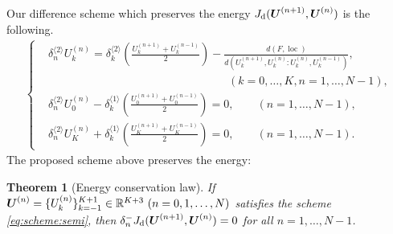 \documentclass[dvipdfmx-if-dvi,autodetect-engine,ja=standard]{amsart}
\numberwithin{equation}{section} %
\def\vect#1{\mbox{\boldmath $#1$}} %
\DeclareMathOperator{\loc}{loc}
\newtheorem{theorem}[definition]{Theorem}
\begin{document}
Our difference scheme which
preserves the energy
$J_{\mathrm{d}}(\vect{U}^{(n+1)}, \vect{U}^{(n)})$
is the following.
\begin{align}\label{eq:scheme:semi}
    \left\{
    \begin{alignedat}{1}
    &\delta_n^{\langle 2\rangle} U_k^{(n)}
    = \delta_k^{\langle 2 \rangle}
    \left(
        \frac{U_k^{(n+1)}+U_k^{(n-1)}}{2}
    \right)
    -
        \frac{d(F,\loc)}{d(U_k^{(n+1)},U_k^{(n)} : U_k^{(n)}, U_k^{(n-1)})}, \\
    &\qquad \qquad \qquad \qquad \qquad \qquad \qquad \qquad 
        (k=0,\ldots,K, n=1,\ldots,N-1),\\
    &\delta_n^{\langle 2\rangle} U_0^{(n)}
        - \delta_k^{\langle 1 \rangle}
        \left(
            \frac{U_0^{(n+1)}+U_0^{(n-1)}}{2}
        \right)
        = 0,
        \qquad (n=1,\ldots,N-1),\\
    &\delta_n^{\langle 2\rangle} U_K^{(n)}
       + \delta_k^{\langle 1 \rangle}
        \left(
            \frac{U_K^{(n+1)}+U_K^{(n-1)}}{2}
        \right)
        = 0,
        \qquad (n=1,\ldots,N-1).
    \end{alignedat}
    \right.
\end{align}
The proposed scheme above preserves the energy:
\begin{theorem}[Energy conservation law]\label{thm:energy:conserv:semi}
If
$\vect{U}^{(n)} = \{ U_k^{(n)} \}_{k=-1}^{K+1} \in \mathbb{R}^{K+3} \ (n=0,1,\ldots,N)$
satisfies the scheme \eqref{eq:scheme:semi},
then
$\delta_n^- J_{\mathrm{d}}(\vect{U}^{(n+1)}, \vect{U}^{(n)}) = 0$
for all
$n =1,\ldots,N-1$.
\end{theorem}
\end{document}
